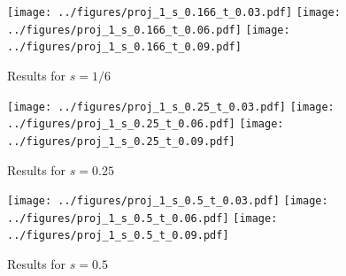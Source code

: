 \documentclass[twocolumn,10pt]{asme2ej}
\begin{document}
%

%

%


\clearpage
\begin{figure}[b]
\begin{center}
\texttt{[image: ../figures/proj\_1\_s\_0.166\_t\_0.03.pdf]}
\texttt{[image: ../figures/proj\_1\_s\_0.166\_t\_0.06.pdf]}
\texttt{[image: ../figures/proj\_1\_s\_0.166\_t\_0.09.pdf]}
\caption{Results for $s = 1/6$}
\end{center}
\end{figure}

\begin{figure}[htb]
\begin{center}
\texttt{[image: ../figures/proj\_1\_s\_0.25\_t\_0.03.pdf]}
\texttt{[image: ../figures/proj\_1\_s\_0.25\_t\_0.06.pdf]}
\texttt{[image: ../figures/proj\_1\_s\_0.25\_t\_0.09.pdf]}
\caption{Results for $s = 0.25$}
\end{center}
\end{figure}

\begin{figure}[htb]
\begin{center}
\texttt{[image: ../figures/proj\_1\_s\_0.5\_t\_0.03.pdf]}
\texttt{[image: ../figures/proj\_1\_s\_0.5\_t\_0.06.pdf]}
\texttt{[image: ../figures/proj\_1\_s\_0.5\_t\_0.09.pdf]}
\caption{Results for $s = 0.5$}
\end{center}
\end{figure}
\end{document}
